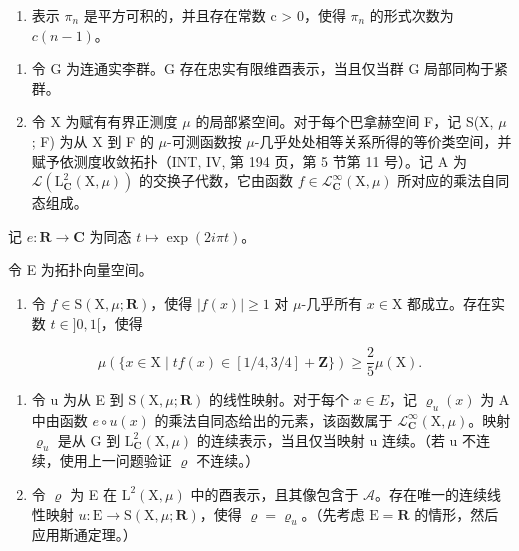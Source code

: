 \begin{enumerate}
\def\labelenumi{\alph{enumi})}
\setcounter{enumi}{7}
\tightlist
\item
  表示 \(\pi_{n}\) 是平方可积的，并且存在常数 c > 0，使得 \(\pi_{n}\) 的形式次数为 \(c(n - 1)\)。
\end{enumerate}

\begin{enumerate}
\def\labelenumi{\arabic{enumi})}
\setcounter{enumi}{16}
\item
  令 G 为连通实李群。G 存在忠实有限维酉表示，当且仅当群 G 局部同构于紧群。
\item
  令 X 为赋有有界正测度 \(\mu\) 的局部紧空间。对于每个巴拿赫空间 F，记 S(X, \(\mu\) ; F) 为从 X 到 F 的 \(\mu\)-可测函数按 \(\mu\)-几乎处处相等关系所得的等价类空间，并赋予依测度收敛拓扑（INT, IV, 第 194 页，第 5 节第 11 号）。记 A 为 \(\mathcal{L}(\mathrm{L}_{\mathbf{C}}^{2}(\mathrm{X},\mu))\) 的交换子代数，它由函数 \(f \in \mathcal{L}_{\mathbf{C}}^{\infty}(\mathrm{X},\mu)\) 所对应的乘法自同态组成。
\end{enumerate}

记 \(e\colon \mathbf{R}\to \mathbf{C}\) 为同态 \(t\mapsto \exp (2i\pi t)\)。

令 E 为拓扑向量空间。

\begin{enumerate}
\def\labelenumi{\alph{enumi})}
\tightlist
\item
  令 \(f \in \mathrm{S}(\mathrm{X}, \mu; \mathbf{R})\)，使得 \(|f(x)| \geqslant 1\) 对 \(\mu\)-几乎所有 \(x \in \mathrm{X}\) 都成立。存在实数 \(t \in ]0, 1[\)，使得
\end{enumerate}

\[
\mu (\{x \in \mathrm{X} \mid t f (x) \in [ 1 / 4, 3 / 4 ] + \mathbf {Z} \}) \geqslant \frac {2}{5} \mu (\mathrm{X}).
\]

\begin{enumerate}
\def\labelenumi{\alph{enumi})}
\setcounter{enumi}{1}
\item
  令 u 为从 E 到 \(\mathrm{S}(\mathrm{X},\mu;\mathbf{R})\) 的线性映射。对于每个 \(x\in E\)，记 \(\varrho_{u}(x)\) 为 A 中由函数 \(e\circ u(x)\) 的乘法自同态给出的元素，该函数属于 \(\mathcal{L}_{\mathbf{C}}^{\infty}(\mathrm{X},\mu)\)。映射 \(\varrho_{u}\) 是从 G 到 \(\mathrm{L}_{\mathbf{C}}^{2}(\mathrm{X},\mu)\) 的连续表示，当且仅当映射 u 连续。（若 u 不连续，使用上一问题验证 \(\varrho\) 不连续。）
\item
  令 \(\varrho\) 为 E 在 \(\mathrm{L}^2 (\mathrm{X},\mu)\) 中的酉表示，且其像包含于 \(\mathcal{A}\)。存在唯一的连续线性映射 \(u\colon \mathrm{E}\to \mathrm{S}(\mathrm{X},\mu ;\mathbf{R})\)，使得 \(\varrho = \varrho_{u}\)。（先考虑 \(\mathrm{E} = \mathbf{R}\) 的情形，然后应用斯通定理。）
\end{enumerate}

